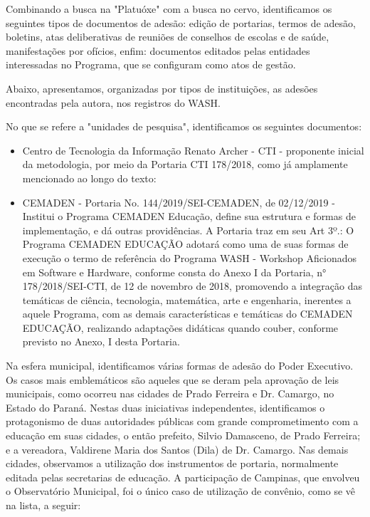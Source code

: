 Combinando a busca na "Platuóxe" com a busca no cervo, identificamos os seguintes tipos de documentos de adesão:  edição de portarias, termos de adesão, boletins, atas deliberativas de reuniões de conselhos de escolas e de saúde, manifestações por ofícios, enfim: documentos editados pelas entidades interessadas no Programa, que se configuram como atos de gestão.

Abaixo, apresentamos, organizadas por tipos de instituições, as adesões encontradas pela autora, nos registros do WASH.

No que se refere a "unidades de pesquisa", identificamos os seguintes documentos:


\begin{itemize}
\item Centro de Tecnologia da Informação Renato Archer - CTI - proponente inicial da metodologia, por meio da Portaria CTI 178/2018, como já amplamente mencionado ao longo do texto:
\item CEMADEN - Portaria No. 144/2019/SEI-CEMADEN, de 02/12/2019 - Institui o Programa CEMADEN Educação, define sua estrutura e formas de implementação, e dá outras providências. A Portaria traz em seu Art 3º.: O Programa CEMADEN EDUCAÇÃO adotará como uma de suas formas de execução o termo de referência do Programa WASH - Workshop Aficionados em Software e Hardware, conforme consta do Anexo I da Portaria, n° 178/2018/SEI-CTI, de 12 de novembro de 2018, promovendo a integração das temáticas de ciência, tecnologia, matemática, arte e engenharia, inerentes a aquele Programa, com as demais características e temáticas do CEMADEN EDUCAÇÃO, realizando adaptações didáticas quando couber, conforme previsto no Anexo, I desta Portaria.
\end{itemize}

Na esfera municipal, identificamos  várias formas de adesão do Poder Executivo. Os casos mais emblemáticos são aqueles que se deram pela aprovação de leis municipais, como ocorreu nas cidades de Prado Ferreira e Dr. Camargo, no Estado do Paraná. Nestas duas iniciativas independentes, identificamos o protagonismo de duas autoridades públicas com grande comprometimento com a educação em suas cidades, o então prefeito, Silvio Damasceno, de Prado Ferreira; e a vereadora, Valdirene Maria dos Santos (Dila)  de Dr. Camargo. Nas demais cidades, observamos a utilização dos instrumentos de portaria, normalmente editada pelas secretarias de educação. A participação de Campinas, que envolveu o Observatório Municipal, foi o único caso de utilização de convênio, como se vê na lista, a seguir:


